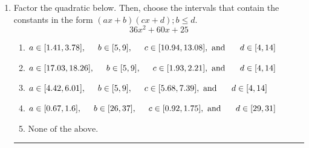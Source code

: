 \documentclass[14pt]{extbook}
\newcommand{\litem}[1]{\item#1\hspace*{-1cm}\rule{\textwidth}{0.4pt}}
\begin{document}
\begin{enumerate}
{\begin{enumerate}[label=\Alph*.]
\end{enumerate} }
\litem{
Factor the quadratic below. Then, choose the intervals that contain the constants in the form $(ax+b)(cx+d); b \leq d.$\[ 36x^{2} +60 x + 25 \]\begin{enumerate}[label=\Alph*.]
\item \( a \in [1.41, 3.78], \hspace*{5mm} b \in [5, 9], \hspace*{5mm} c \in [10.94, 13.08], \text{ and } \hspace*{5mm} d \in [4, 14] \)
\item \( a \in [17.03, 18.26], \hspace*{5mm} b \in [5, 9], \hspace*{5mm} c \in [1.93, 2.21], \text{ and } \hspace*{5mm} d \in [4, 14] \)
\item \( a \in [4.42, 6.01], \hspace*{5mm} b \in [5, 9], \hspace*{5mm} c \in [5.68, 7.39], \text{ and } \hspace*{5mm} d \in [4, 14] \)
\item \( a \in [0.67, 1.6], \hspace*{5mm} b \in [26, 37], \hspace*{5mm} c \in [0.92, 1.75], \text{ and } \hspace*{5mm} d \in [29, 31] \)
\item \( \text{None of the above.} \)


\end{enumerate}}
\end{enumerate}
\end{document}
